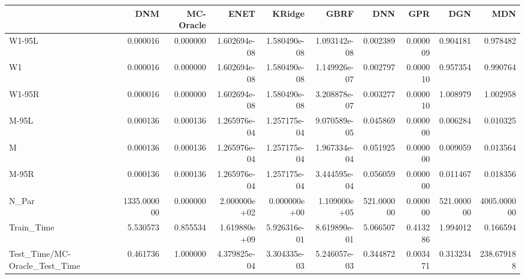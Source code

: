 \begin{tabular}{lrrrrrrrrr}
\toprule
{} &          DNM &  MC-Oracle &          ENET &        KRidge &          GBRF &         DNN &       GPR &         DGN &          MDN \\
\midrule
W1-95L                        &     0.000016 &   0.000000 &  1.602694e-08 &  1.580490e-08 &  1.093142e-08 &    0.002389 &  0.000009 &    0.904181 &     0.978482 \\
W1                            &     0.000016 &   0.000000 &  1.602694e-08 &  1.580490e-08 &  1.149926e-07 &    0.002797 &  0.000010 &    0.957354 &     0.990764 \\
W1-95R                        &     0.000016 &   0.000000 &  1.602694e-08 &  1.580490e-08 &  3.208878e-07 &    0.003277 &  0.000010 &    1.008979 &     1.002958 \\
M-95L                         &     0.000136 &   0.000136 &  1.265976e-04 &  1.257175e-04 &  9.070589e-05 &    0.045869 &  0.000000 &    0.006284 &     0.010325 \\
M                             &     0.000136 &   0.000136 &  1.265976e-04 &  1.257175e-04 &  1.967334e-04 &    0.051925 &  0.000000 &    0.009059 &     0.013564 \\
M-95R                         &     0.000136 &   0.000136 &  1.265976e-04 &  1.257175e-04 &  3.444595e-04 &    0.056059 &  0.000000 &    0.011467 &     0.018356 \\
N\_Par                         &  1335.000000 &   0.000000 &  2.000000e+02 &  0.000000e+00 &  1.109000e+05 &  521.000000 &  0.000000 &  521.000000 &  4005.000000 \\
Train\_Time                    &     5.530573 &   0.855534 &  1.619880e+09 &  5.926316e-01 &  8.619890e-01 &    5.066507 &  0.413286 &    1.994012 &     0.166594 \\
Test\_Time/MC-Oracle\_Test\_Time &     0.461736 &   1.000000 &  4.379825e-04 &  3.304335e-03 &  5.246057e-03 &    0.344872 &  0.003471 &    0.313234 &   238.679188 \\
\bottomrule
\end{tabular}
